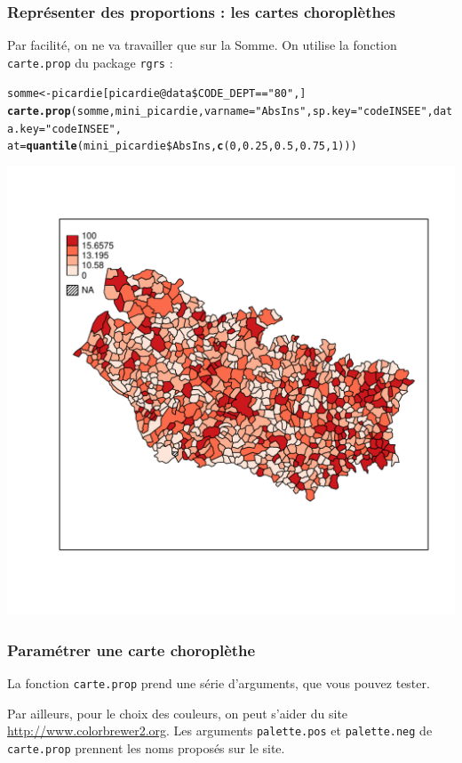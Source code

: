 \documentclass[slidetop, 10pt]{beamer}\usepackage{graphicx, color}
\makeatletter
\newcommand{\hlfunctioncall}[1]{\textcolor[rgb]{0.501960784313725,0,0.329411764705882}{\textbf{#1}}}%
\newcommand{\hlstring}[1]{\textcolor[rgb]{0.6,0.6,1}{#1}}%
\newenvironment{kframe}{%
 \def\at@end@of@kframe{}%
 \ifinner\ifhmode%
  \def\at@end@of@kframe{\end{minipage}}%
  \begin{minipage}{\columnwidth}%
 \fi\fi%
 \def\FrameCommand##1{\hskip\@totalleftmargin \hskip-\fboxsep
 \colorbox{shadecolor}{##1}\hskip-\fboxsep
     \hskip-\linewidth \hskip-\@totalleftmargin \hskip\columnwidth}%
 \MakeFramed {\advance\hsize-\width
   \@totalleftmargin\z@ \linewidth\hsize
   \@setminipage}}%
 {\par\unskip\endMakeFramed%
 \at@end@of@kframe}
\newenvironment{knitrout}{}{} %
\renewenvironment{knitrout}{\begin{tiny}}{\end{tiny}}
\makeatother
\begin{document}
\begin{frame}
\frametitle{Représenter des proportions : les cartes choroplèthes}
Par facilité, on ne va travailler que sur la Somme. On utilise la fonction \verb!carte.prop! du package \verb!rgrs! :

\begin{knitrout}\tiny
{}\color{fgcolor}\begin{kframe}
\begin{alltt}
somme <- picardie[picardie@data\$CODE\_DEPT == \hlstring{"80"}, ]
\hlfunctioncall{carte.prop}(somme, mini\_picardie, varname = \hlstring{"AbsIns"}, sp.key = \hlstring{"codeINSEE"}, data.key = \hlstring{"codeINSEE"}, 
    at = \hlfunctioncall{quantile}(mini\_picardie\$AbsIns, \hlfunctioncall{c}(0, 0.25, 0.5, 0.75, 1)))
\end{alltt}
\end{kframe}

{\centering \includegraphics[width=.55\linewidth]{images/carteprop} 

}


\end{knitrout}



\end{frame}

\begin{frame}[fragile]
\frametitle{Paramétrer une carte choroplèthe}

La fonction \verb!carte.prop! prend une série d'arguments, que vous pouvez tester.

Par ailleurs, pour le choix des couleurs, on peut s'aider du site \url{http://www.colorbrewer2.org}. Les arguments \verb!palette.pos! et \verb!palette.neg! de \verb!carte.prop! prennent les noms proposés sur le site. 
\end{frame}
\end{document}
